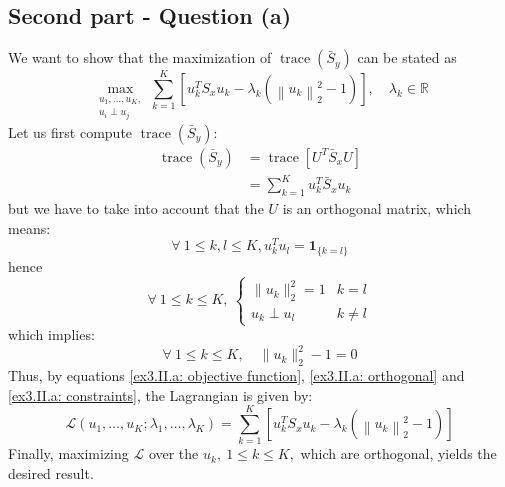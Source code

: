 \documentclass[12pt]{article}
\begin{document}
\subsection{Second part - Question (a)}
We want to show that the maximization of \(\operatorname{trace}(\bar S_y)\) can be stated as
\[
    \max _{\substack{u_{1}, \ldots, u_{K}, \\ u_{i} \perp u_{j}}} \sum_{k=1}^{K} \left[u_{k}^{T} S_{x} u_{k}-\lambda_{k} \left(\left\|u_{k}\right\|_{2}^{2} - 1\right) \right], \quad \lambda_{k} \in \mathbb{R}
\]
Let us first compute \(\operatorname{trace}(\bar S_y)\):
\begin{align}
    \operatorname{trace}(\bar S_y)
    \nonumber
     & = \operatorname{trace} \left[ U^T \bar S_x U \right] \\
    \label{ex3.II.a: objective function}
     & = \sum_{k=1}^K u_k^T \bar S_{x} u_k
\end{align}
but we have to take into account that the \(U\) is an orthogonal matrix, which means:
\[
    \forall \ 1 \leq k,l \leq K, u_k^T u_l = \boldsymbol{1}_{\{k=l\}}
\]
hence
\begin{equation}
    \label{ex3.II.a: orthogonal}
    \forall \ 1 \leq k \leq K, \
    \begin{cases}
        \|u_k\|_2^2 = 1 & k=l      \\
        u_k \perp u_l   & k \neq l
    \end{cases}
\end{equation}
which implies:
\begin{equation}
    \label{ex3.II.a: constraints}
    \forall \ 1 \leq k \leq K, \quad \|u_k\|_2^2 - 1 = 0
\end{equation}
Thus, by equations \eqref{ex3.II.a: objective function}, \eqref{ex3.II.a: orthogonal} and \eqref{ex3.II.a: constraints}, the Lagrangian is given by:
\begin{equation*}
    \mathcal{L} (u_1, \ldots, u_K; \lambda_1, \ldots, \lambda_K) = \sum_{k=1}^{K} \left[u_{k}^{T} S_{x} u_{k}-\lambda_{k} \left(\left\|u_{k}\right\|_{2}^{2} - 1\right) \right]
\end{equation*}
Finally, maximizing \(\mathcal{L}\) over the \(u_k, \ 1 \leq k \leq K,\) which are orthogonal, yields the desired result.
\end{document}
